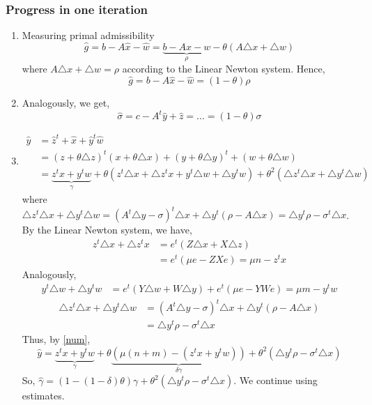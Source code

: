 \documentclass[a4paper]{article}
\numberwithin{lecref}{section}
\begin{document}
\subsubsection{Progress in one iteration}
\begin{enumerate}
	\item Measuring primal admissibility
		\[ \hat g = b - A \hat x - \hat w = \underbrace{b - Ax - w}_{\rho} - \theta (A\triangle x + \triangle w) \]
		where $A\triangle x + \triangle w = \rho$ according to the Linear Newton system. Hence,
		\[ \hat g = b - A \hat x - \hat w = (1 - \theta) \rho \]
	\item Analogously, we get,
		\[ \hat \sigma = c - A^t \hat y + \hat z = \dots = (1 - \theta) \sigma \]
	\item
		\begin{align}
			\hat y &= \hat z^t + \hat x + \hat y^t \hat w \label{num}\\
				&= (z + \theta \triangle z)^t (x + \theta \triangle x) + (y + \theta \triangle y)^t + (w + \theta \triangle w) \nonumber\\
				&= \underbrace{z^t x + y^t w}_{\gamma} + \theta (z^t \triangle x + \triangle z^t x + y^t \triangle w + \triangle y^t w)
				+ \theta^2 (\triangle z^t \triangle x + \triangle y^t \triangle w) \nonumber
		\end{align}
		where $\triangle z^t \triangle x + \triangle y^t \triangle w = (A^t \triangle y - \sigma)^t \triangle x + \triangle y^t (\rho - A \triangle x) = \triangle y^t \rho - \sigma^t \triangle x$.
		By the Linear Newton system, we have,
		\begin{align*}
			z^t \triangle x + \triangle z^t x &= e^t \left(Z \triangle x + X \triangle z\right) \\
				&= e^t \left(\mu e - ZXe\right) = \mu n - z^t x
		\end{align*}
		Analogously,
		\begin{align*}
			y^t \triangle w + \triangle y^t w &= e^t \left(Y \triangle w + W \triangle y\right) + e^t \left(\mu e - YWe\right) = \mu m - y^t w
		\end{align*}
		\begin{align*}
			\triangle z^t \triangle x + \triangle y^t \triangle w
				&= (A^t \triangle y - \sigma)^t \triangle x + \triangle y^t (\rho - A \triangle x) \\
				&= \triangle y^t \rho - \sigma^t \triangle x
		\end{align*}
		Thus, by \eqref{num},
		\[ \hat y = \underbrace{z^t x + y^t w}_{\gamma} + \theta\underbrace{\left(\mu(n + m) - (z^t x + y^t w)\right)}_{\delta \gamma} + \theta^2 \left(\triangle y^t \rho - \sigma^t \triangle x\right) \]
		So, $\hat\gamma = (1 - (1 - \delta) \theta) \gamma + \theta^2 \left(\triangle y^t \rho - \sigma^t \triangle x\right)$.
		We continue using estimates.


\end{enumerate}
\end{document}
